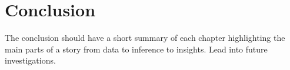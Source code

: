 \chapter{Conclusion}

The conclusion should have a short summary of each chapter highlighting the main parts of a story from data to inference to insights. Lead into future investigations.  